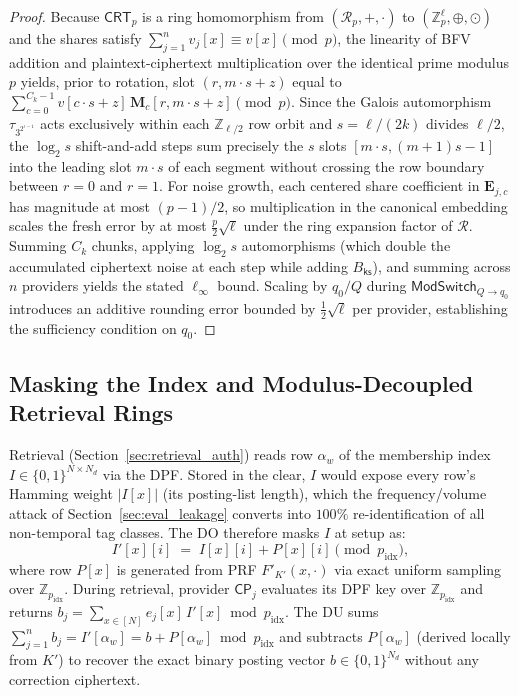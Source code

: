 \documentclass[11pt,a4paper]{article}
\begin{document}
\begin{proof}
Because $\mathsf{CRT}_p$ is a ring homomorphism from $(\mathcal{R}_p, +, \cdot)$ to $(\mathbb{Z}_p^\ell, \oplus, \odot)$ and the shares satisfy $\sum_{j=1}^n v_j[x] \equiv v[x] \pmod p$, the linearity of BFV addition and plaintext-ciphertext multiplication over the identical prime modulus $p$ yields, prior to rotation, slot $(r, m\cdot s + z)$ equal to $\sum_{c=0}^{C_k-1} v[c\cdot s + z]\, \mathbf{M}_c[r, m\cdot s + z] \pmod p$. Since the Galois automorphism $\tau_{3^{2^{\iota-1}}}$ acts exclusively within each $\mathbb{Z}_{\ell/2}$ row orbit and $s = \ell/(2k)$ divides $\ell/2$, the $\log_2 s$ shift-and-add steps sum precisely the $s$ slots $[m\cdot s, (m+1)s - 1]$ into the leading slot $m\cdot s$ of each segment without crossing the row boundary between $r=0$ and $r=1$. For noise growth, each centered share coefficient in $\mathbf{E}_{j,c}$ has magnitude at most $(p-1)/2$, so multiplication in the canonical embedding scales the fresh error by at most $\frac{p}{2}\sqrt{\ell}$ under the ring expansion factor of $\mathcal{R}$. Summing $C_k$ chunks, applying $\log_2 s$ automorphisms (which double the accumulated ciphertext noise at each step while adding $B_{\mathsf{ks}}$), and summing across $n$ providers yields the stated $\ell_\infty$ bound. Scaling by $q_0 / Q$ during $\mathsf{ModSwitch}_{Q \to q_0}$ introduces an additive rounding error bounded by $\frac{1}{2}\sqrt{\ell}$ per provider, establishing the sufficiency condition on $q_0$.
\end{proof}

\subsection{Masking the Index and Modulus-Decoupled Retrieval Rings}\label{sec:masking}

Retrieval (Section~\ref{sec:retrieval_auth}) reads row $\alpha_w$ of the membership index $I \in \{0,1\}^{N \times N_d}$ via the DPF. Stored in the clear, $I$ would expose every row's Hamming weight $|I[x]|$ (its posting-list length), which the frequency/volume attack of Section~\ref{sec:eval_leakage} converts into $100\%$ re-identification of all non-temporal tag classes. The DO therefore masks $I$ at setup as:
\begin{equation}
    I'[x][i] \;=\; I[x][i] + P[x][i] \pmod{p_{\mathrm{idx}}},
\end{equation}
where row $P[x]$ is generated from PRF $F'_{K'}(x, \cdot)$ via exact uniform sampling over $\mathbb{Z}_{p_{\mathrm{idx}}}$. During retrieval, provider $\mathsf{CP}_j$ evaluates its DPF key over $\mathbb{Z}_{p_{\mathrm{idx}}}$ and returns $b_j = \sum_{x \in [N]} e_j[x]\, I'[x] \bmod p_{\mathrm{idx}}$. The DU sums $\sum_{j=1}^n b_j = I'[\alpha_w] = b + P[\alpha_w] \bmod p_{\mathrm{idx}}$ and subtracts $P[\alpha_w]$ (derived locally from $K'$) to recover the exact binary posting vector $b \in \{0,1\}^{N_d}$ without any correction ciphertext.
\end{document}

